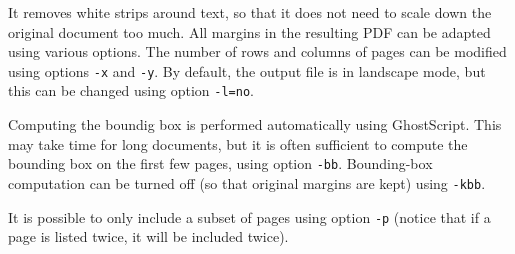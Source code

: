 \documentclass{article}
\begin{document}
It removes white strips around text, so that it does not need to scale
down the original document too much. All margins in the resulting PDF
can be adapted using various options. The number of rows and columns
of pages can be modified using options \verb+-x+ and \verb+-y+. By
default, the output file is in landscape mode, but this can be changed
using option \verb+-l=no+.

Computing the boundig box is performed automatically using
GhostScript. This may take time for long documents, but it is often
sufficient to compute the bounding box on the first few pages, using
option \verb+-bb+. Bounding-box computation can be turned off (so that
original margins are kept) using \verb+-kbb+. 

It is possible to only include a subset of pages using option
\verb+-p+ (notice that if a page is listed twice, it will be included
twice).
\end{document}
